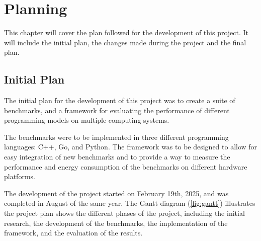 \chapter{Planning}\label{chap:planning}

This chapter will cover the plan followed for the development of this project. It will include the initial plan, the changes made during the project and the final plan.

\section{Initial Plan}
The initial plan for the development of this project was to create a suite of benchmarks, and a framework for evaluating the performance of different programming models on multiple computing systems. 

The benchmarks were to be implemented in three different programming languages: C++, Go, and Python. The framework was to be designed to allow for easy integration of new benchmarks and to provide a way to measure the performance and energy consumption of the benchmarks on different hardware platforms.

The development of the project started on February 19th, 2025, and was completed in August of the same year. The Gantt diagram (\autoref{fig:gantt}) illustrates the project plan shows the different phases of the project, including the initial research, the development of the benchmarks, the implementation of the framework, and the evaluation of the results.

